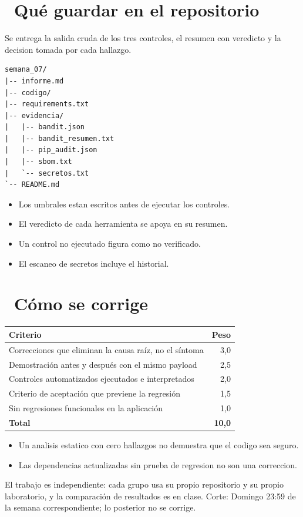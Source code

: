 \documentclass[11pt,a4paper]{article}
\newcommand{\iconotexto}[2]{\textcolor{cyanNeon}{\faIcon{#1}}~#2}
\begin{document}
\section{\iconotexto{box-open}{Qué guardar en el repositorio}}

Se entrega la salida cruda de los tres controles, el resumen con veredicto y la decision tomada por cada hallazgo.

\begin{lstlisting}[style=estiloCodigo]
semana_07/
|-- informe.md
|-- codigo/
|-- requirements.txt
|-- evidencia/
|   |-- bandit.json
|   |-- bandit_resumen.txt
|   |-- pip_audit.json
|   |-- sbom.txt
|   `-- secretos.txt
`-- README.md
\end{lstlisting}

\begin{itemize}[leftmargin=1.4em,itemsep=2pt,topsep=3pt]
  \item Los umbrales estan escritos antes de ejecutar los controles.
  \item El veredicto de cada herramienta se apoya en su resumen.
  \item Un control no ejecutado figura como no verificado.
  \item El escaneo de secretos incluye el historial.
\end{itemize}

\section{\iconotexto{ruler-combined}{Cómo se corrige}}

\begin{tabularx}{\linewidth}{@{}X r@{}}
\toprule
Criterio & Peso\\
\midrule
Correcciones que eliminan la causa raíz, no el síntoma & 3,0 \\
Demostración antes y después con el mismo payload & 2,5 \\
Controles automatizados ejecutados e interpretados & 2,0 \\
Criterio de aceptación que previene la regresión & 1,5 \\
Sin regresiones funcionales en la aplicación & 1,0 \\
\midrule
\textbf{Total} & \textbf{10,0}\\
\bottomrule
\end{tabularx}

\begin{itemize}[leftmargin=1.4em,itemsep=2pt,topsep=3pt]
  \item Un analisis estatico con cero hallazgos no demuestra que el codigo sea seguro.
  \item Las dependencias actualizadas sin prueba de regresion no son una correccion.
\end{itemize}

\begin{cajaRecuerda}El trabajo es independiente: cada grupo usa su propio repositorio y su propio laboratorio, y la comparación de resultados es en clase. Corte: Domingo 23:59 de la semana correspondiente; lo posterior no se corrige.
\end{cajaRecuerda}
\end{document}
